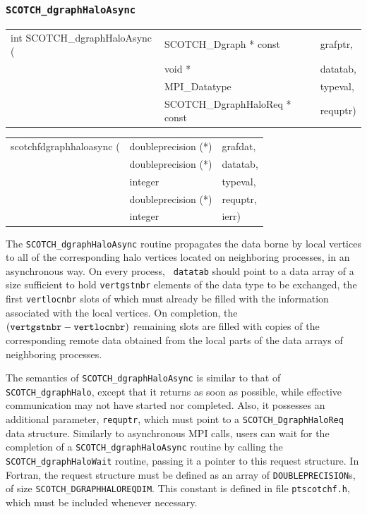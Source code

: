 \subsubsection{{\tt SCOTCH\_dgraphHaloAsync}}
\label{sec-lib-func-dgraphhaloasync}

\begin{itemize}
\progsyn

{\tt\begin{tabular}{l@{}ll}

int SCOTCH\_dgraphHaloAsync ( & SCOTCH\_Dgraph * const        & grafptr, \\
                              & void *                        & datatab, \\
                              & MPI\_Datatype                 & typeval, \\
                              & SCOTCH\_DgraphHaloReq * const & requptr)
\end{tabular}}

{\tt\begin{tabular}{l@{}ll}
scotchfdgraphhaloasync ( & doubleprecision (*) & grafdat, \\
                         & doubleprecision (*) & datatab, \\
                         & integer             & typeval, \\
                         & doubleprecision (*) & requptr, \\
                         & integer             & ierr)
\end{tabular}}

\progdes

The {\tt SCOTCH\_dgraphHaloAsync} routine propagates the data borne by
local vertices to all of the corresponding halo vertices located on
neighboring processes, in an asynchronous way. On every process, {\tt
datatab} should point to a data array of a size sufficient to hold
{\tt vert\lbt gst\lbt nbr} elements of the data type to be exchanged,
the first {\tt vertlocnbr} slots of which must already be filled with
the information associated with the local vertices. On completion, the
$({\tt vert\lbt gst\lbt nbr} - {\tt vert\lbt loc\lbt nbr})$ remaining
slots are filled with copies of the corresponding remote data obtained
from the local parts of the data arrays of neighboring processes.

The semantics of {\tt SCOTCH\_dgraphHaloAsync} is similar to that
of {\tt SCOTCH\_dgraph\lbt Halo}, except that it returns as soon as
possible, while effective communication may not have started nor
completed. Also, it possesses an additional parameter, {\tt requptr},
which must point to a {\tt SCOTCH\_\lbt Dgraph\lbt Halo\lbt Req} data
structure. Similarly to asynchronous MPI calls, users can wait for the
completion of a {\tt SCOTCH\_dgraph\lbt Halo\lbt Async} routine by
calling the {\tt SCOTCH\_dgraph\lbt Halo\lbt Wait} routine, passing it
a pointer to this request structure. In Fortran, the request structure
must be defined as an array of {\tt DOUBLEPRECISION}s, of size
{\tt SCOTCH\_\lbt DGRAPH\lbt HALO\lbt REQDIM}. This constant is
defined in file {\tt ptscotchf.h}, which must be included whenever
necessary.


\end{itemize}
